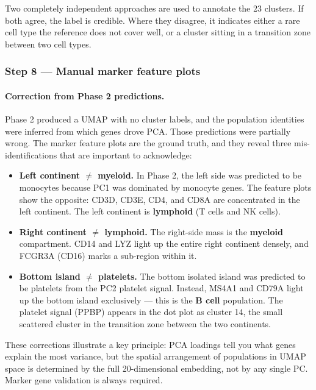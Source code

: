 \documentclass[11pt, a4paper]{article}
\begin{document}
Two completely independent approaches are used to annotate the 23 clusters.
If both agree, the label is credible. Where they disagree, it indicates either
a rare cell type the reference does not cover well, or a cluster sitting in a
transition zone between two cell types.

\subsubsection*{Step 8 — Manual marker feature plots}

\paragraph*{Correction from Phase 2 predictions.}
Phase 2 produced a UMAP with no cluster labels, and the population identities
were inferred from which genes drove PCA. Those predictions were partially wrong.
The marker feature plots are the ground truth, and they reveal three mis-identifications
that are important to acknowledge:

\begin{itemize}[nosep]
  \item \textbf{Left continent $\neq$ myeloid.} In Phase 2, the left side was
        predicted to be monocytes because PC1 was dominated by monocyte genes.
        The feature plots show the opposite: CD3D, CD3E, CD4, and CD8A are
        concentrated in the left continent. The left continent is \textbf{lymphoid}
        (T cells and NK cells).
  \item \textbf{Right continent $\neq$ lymphoid.} The right-side mass is the
        \textbf{myeloid} compartment. CD14 and LYZ light up the entire right
        continent densely, and FCGR3A (CD16) marks a sub-region within it.
  \item \textbf{Bottom island $\neq$ platelets.} The bottom isolated island was
        predicted to be platelets from the PC2 platelet signal. Instead, MS4A1
        and CD79A light up the bottom island exclusively — this is the
        \textbf{B cell} population. The platelet signal (PPBP) appears in the
        dot plot as cluster 14, the small scattered cluster in the transition
        zone between the two continents.
\end{itemize}

These corrections illustrate a key principle: PCA loadings tell you what genes
explain the most variance, but the spatial arrangement of populations in UMAP
space is determined by the full 20-dimensional embedding, not by any single PC.
Marker gene validation is always required.
\end{document}
